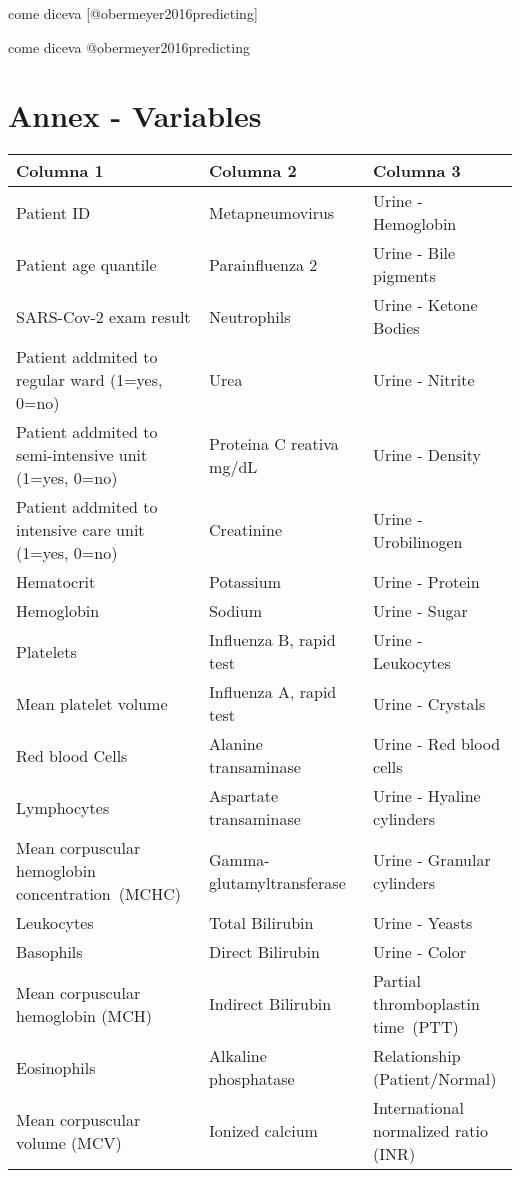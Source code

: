 \documentclass[
]{article}
\begin{document}
come diceva {[}@obermeyer2016predicting{]}

come diceva @obermeyer2016predicting

\hypertarget{annex---variables-1}{%
\section{Annex - Variables}\label{annex---variables-1}}

\begin{tabular}{l|l|l}
\hline
Columna 1 & Columna 2 & Columna 3\\
\hline
Patient ID & Metapneumovirus & Urine - Hemoglobin\\
\hline
Patient age quantile & Parainfluenza 2 & Urine - Bile pigments\\
\hline
SARS-Cov-2 exam result & Neutrophils & Urine - Ketone Bodies\\
\hline
Patient addmited to regular ward (1=yes, 0=no) & Urea & Urine - Nitrite\\
\hline
Patient addmited to semi-intensive unit (1=yes, 0=no) & Proteina C reativa mg/dL & Urine - Density\\
\hline
Patient addmited to intensive care unit (1=yes, 0=no) & Creatinine & Urine - Urobilinogen\\
\hline
Hematocrit & Potassium & Urine - Protein\\
\hline
Hemoglobin & Sodium & Urine - Sugar\\
\hline
Platelets & Influenza B, rapid test & Urine - Leukocytes\\
\hline
Mean platelet volume & Influenza A, rapid test & Urine - Crystals\\
\hline
Red blood Cells & Alanine transaminase & Urine - Red blood cells\\
\hline
Lymphocytes & Aspartate transaminase & Urine - Hyaline cylinders\\
\hline
Mean corpuscular hemoglobin concentration (MCHC) & Gamma-glutamyltransferase  & Urine - Granular cylinders\\
\hline
Leukocytes & Total Bilirubin & Urine - Yeasts\\
\hline
Basophils & Direct Bilirubin & Urine - Color\\
\hline
Mean corpuscular hemoglobin (MCH) & Indirect Bilirubin & Partial thromboplastin time (PTT) \\
\hline
Eosinophils & Alkaline phosphatase & Relationship (Patient/Normal)\\
\hline
Mean corpuscular volume (MCV) & Ionized calcium  & International normalized ratio (INR)\\

\end{tabular}
\end{document}
